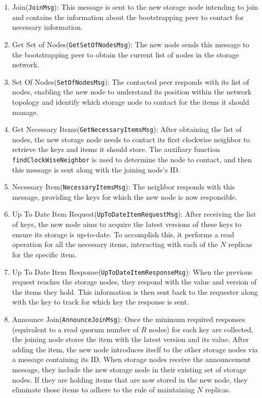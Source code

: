 \documentclass[a4paper, 11pt]{article}
\begin{document}
\begin{enumerate}
    \item Join(\verb|JoinMsg|): This message is sent to the new storage node intending to join and contains the information about the bootstrapping peer to contact for necessary information.

    \item Get Set of Nodes(\verb|GetSetOfNodesMsg|): The new node sends this message to the bootstrapping peer to obtain the current list of nodes in the storage network.

    \item Set Of Nodes(\verb|SetOfNodesMsg|): The contacted peer responds with its list of nodes, enabling the new node to understand its position within the network topology and identify which storage node to contact for the items it should manage.

    \item Get Necessary Items(\verb|GetNecessaryItemsMsg|): After obtaining the list of nodes, the new storage node needs to contact its first clockwise neighbor to retrieve the keys and items it should store. The auxiliary function \verb|findClockWiseNeighbor| is used to determine the node to contact, and then this message is sent along with the joining node's ID. 

    \item  Necessary Item(\verb|NecessaryItemsMsg|): The neighbor responds with this message, providing the keys for which the new node is now responsible.

    \item Up To Date Item Request(\verb|UpToDateItemRequestMsg|): After receiving the list of keys, the new node aims to acquire the latest versions of these keys to ensure its storage is up-to-date. To accomplish this, it performs a read operation for all the necessary items, interacting with each of the $N$ replicas for the specific item.

    \item Up To Date Item Response(\verb|UpToDateItemResponseMsg|): When the previous request reaches the storage nodes, they respond with the value and version of the items they hold. This information is then sent back to the requester along with the key to track for which key the response is sent.

    \item Announce Join(\verb|AnnounceJoinMsg|): Once the minimum required responses (equivalent to a read quorum number of $R$ nodes) for each key are collected, the joining node stores the item with the latest version and its value. After adding the item, the new node introduces itself to the other storage nodes via a message containing its ID. When storage nodes receive the announcement message, they include the new storage node in their existing set of storage nodes. If they are holding items that are now stored in the new node, they eliminate those items to adhere to the rule of maintaining $N$ replicas.   

\end{enumerate}
\end{document}
